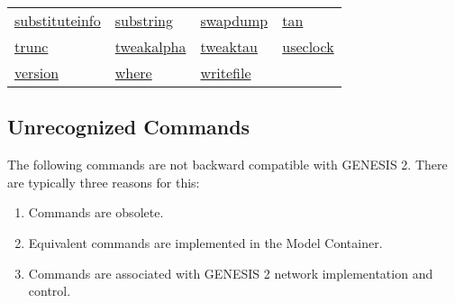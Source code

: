 \documentclass[12pt]{article}
\begin{document}
\begin{tabular}{l l l l}
\href{http://genesis-sim.org/GENESIS/Hyperdoc/Manual-25.html#ss25.185}{substituteinfo}    & \href{http://genesis-sim.org/GENESIS/Hyperdoc/Manual-25.html#ss25.186}{substring}              & \href{http://genesis-sim.org/GENESIS/Hyperdoc/Manual-25.html#ss25.187}{swapdump}& \href{http://genesis-sim.org/GENESIS/Hyperdoc/Manual-25.html#ss25.190}{tan} 	\\
\href{http://genesis-sim.org/GENESIS/Hyperdoc/Manual-25.html#ss25.191}{trunc}                   & \href{http://genesis-sim.org/GENESIS/Hyperdoc/Manual-25.html#ss25.192}{tweakalpha}         & \href{http://genesis-sim.org/GENESIS/Hyperdoc/Manual-25.html#ss25.193}{tweaktau}    & \href{http://genesis-sim.org/GENESIS/Hyperdoc/Manual-25.html#ss25.194}{useclock} \\
\href{http://genesis-sim.org/GENESIS/Hyperdoc/Manual-25.html#ss25.195}{version}              & \href{http://genesis-sim.org/GENESIS/Hyperdoc/Manual-25.html#ss25.201}{where}                    & \href{http://genesis-sim.org/GENESIS/Hyperdoc/Manual-25.html#ss25.203}{writefile}      &   \\
\end{tabular}
 
\subsection*{Unrecognized Commands}

The following commands are not backward compatible with GENESIS 2. There are typically three reasons for this:
\begin{enumerate}
\item Commands are obsolete.
\item Equivalent commands are implemented in the Model Container.
\item Commands are associated with GENESIS 2 network implementation and control. 
\end{enumerate}
\end{document}
